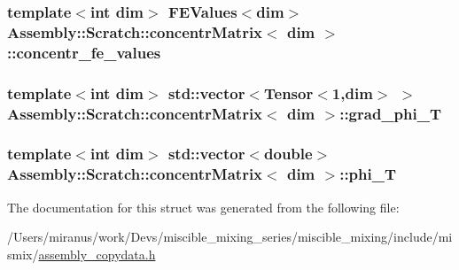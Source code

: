 \subsubsection[{concentr\+\_\+fe\+\_\+values}]{\setlength{\rightskip}{0pt plus 5cm}template$<$int dim$>$ F\+E\+Values$<$dim$>$ {\bf Assembly\+::\+Scratch\+::concentr\+Matrix}$<$ dim $>$\+::concentr\+\_\+fe\+\_\+values}\label{struct_assembly_1_1_scratch_1_1concentr_matrix_ab33eea0fdd2716aa1aab80e22a3c3d1b}
\hypertarget{struct_assembly_1_1_scratch_1_1concentr_matrix_a8a597e54b433d76d7e1f71b65b7155e5}{}
\subsubsection[{grad\+\_\+phi\+\_\+\+T}]{\setlength{\rightskip}{0pt plus 5cm}template$<$int dim$>$ std\+::vector$<$Tensor$<$1,dim$>$ $>$ {\bf Assembly\+::\+Scratch\+::concentr\+Matrix}$<$ dim $>$\+::grad\+\_\+phi\+\_\+\+T}\label{struct_assembly_1_1_scratch_1_1concentr_matrix_a8a597e54b433d76d7e1f71b65b7155e5}
\hypertarget{struct_assembly_1_1_scratch_1_1concentr_matrix_a66a048dcc5601ac8bf72829c8a2eb567}{}
\subsubsection[{phi\+\_\+\+T}]{\setlength{\rightskip}{0pt plus 5cm}template$<$int dim$>$ std\+::vector$<$double$>$ {\bf Assembly\+::\+Scratch\+::concentr\+Matrix}$<$ dim $>$\+::phi\+\_\+\+T}\label{struct_assembly_1_1_scratch_1_1concentr_matrix_a66a048dcc5601ac8bf72829c8a2eb567}


The documentation for this struct was generated from the following file\+:\begin{DoxyCompactItemize}
\item 
/\+Users/miranus/work/\+Devs/miscible\+\_\+mixing\+\_\+series/miscible\+\_\+mixing/include/mismix/\hyperlink{assembly__copydata_8h}{assembly\+\_\+copydata.\+h}\end{DoxyCompactItemize}
